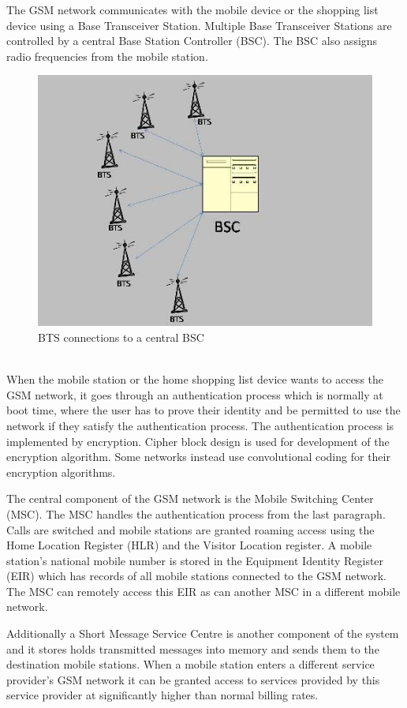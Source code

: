 The GSM network communicates with the mobile device or the shopping list device using a Base Transceiver Station. Multiple Base Transceiver Stations are controlled by a central Base Station Controller (BSC). The BSC also assigns radio frequencies from the mobile station.
\begin{figure}[h]
	\centering
	\includegraphics[scale=0.6]{23}
	\caption{BTS connections to a central BSC}
\end{figure}
\\
When the mobile station or the home shopping list device wants to access the GSM network, it goes through an authentication process which is normally at boot time, where the user has to prove their identity and be  permitted to use the network if they satisfy the authentication process. The authentication process is implemented by encryption. Cipher block design is used for development of the encryption algorithm. Some networks instead use convolutional coding for their encryption algorithms.

The central component of the GSM network is the Mobile Switching Center (MSC). The MSC handles the authentication process from the last paragraph. Calls are switched and mobile stations are granted roaming access using the Home Location Register (HLR) and the Visitor Location register. A mobile station's national mobile number is stored in the Equipment Identity Register (EIR) which has records of all mobile stations connected to the GSM network. The MSC can remotely access this EIR as can another MSC in a different mobile network.

Additionally a Short Message Service Centre is another component of the system and it stores holds transmitted messages into memory and sends them to the destination mobile stations. When a mobile station enters a different service provider's GSM network it can be granted access to services provided by this service provider at significantly higher than normal billing rates.

